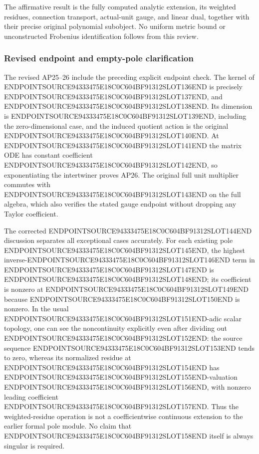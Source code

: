 The affirmative result is the fully computed analytic extension, its weighted residues, connection transport, actual-unit gauge, and linear dual, together with their precise original polynomial subobject. No uniform metric bound or unconstructed Frobenius identification follows from this review.

\subsubsection{Revised endpoint and empty-pole clarification}\label{endpoint-analytic_pole_review--revised-endpoint-and-empty-pole-clarification}

The revised AP25--26 include the preceding explicit endpoint check. The kernel of ENDPOINTSOURCE94333475E18C0C604BF91312SLOT136END is precisely ENDPOINTSOURCE94333475E18C0C604BF91312SLOT137END, and ENDPOINTSOURCE94333475E18C0C604BF91312SLOT138END. Its dimension is ENDPOINTSOURCE94333475E18C0C604BF91312SLOT139END, including the zero-dimensional case, and the induced quotient action is the original ENDPOINTSOURCE94333475E18C0C604BF91312SLOT140END. At ENDPOINTSOURCE94333475E18C0C604BF91312SLOT141END the matrix ODE has constant coefficient ENDPOINTSOURCE94333475E18C0C604BF91312SLOT142END, so exponentiating the intertwiner proves AP26. The original full unit multiplier commutes with ENDPOINTSOURCE94333475E18C0C604BF91312SLOT143END on the full algebra, which also verifies the stated gauge endpoint without dropping any Taylor coefficient.

The corrected ENDPOINTSOURCE94333475E18C0C604BF91312SLOT144END discussion separates all exceptional cases accurately. For each existing pole ENDPOINTSOURCE94333475E18C0C604BF91312SLOT145END, the highest inverse-ENDPOINTSOURCE94333475E18C0C604BF91312SLOT146END term in ENDPOINTSOURCE94333475E18C0C604BF91312SLOT147END is ENDPOINTSOURCE94333475E18C0C604BF91312SLOT148END; its coefficient is nonzero at ENDPOINTSOURCE94333475E18C0C604BF91312SLOT149END because ENDPOINTSOURCE94333475E18C0C604BF91312SLOT150END is nonzero. In the usual ENDPOINTSOURCE94333475E18C0C604BF91312SLOT151END-adic scalar topology, one can see the noncontinuity explicitly even after dividing out ENDPOINTSOURCE94333475E18C0C604BF91312SLOT152END: the source sequence ENDPOINTSOURCE94333475E18C0C604BF91312SLOT153END tends to zero, whereas its normalized residue at ENDPOINTSOURCE94333475E18C0C604BF91312SLOT154END has ENDPOINTSOURCE94333475E18C0C604BF91312SLOT155END-valuation ENDPOINTSOURCE94333475E18C0C604BF91312SLOT156END, with nonzero leading coefficient ENDPOINTSOURCE94333475E18C0C604BF91312SLOT157END. Thus the weighted-residue operation is not a coefficientwise continuous extension to the earlier formal pole module. No claim that ENDPOINTSOURCE94333475E18C0C604BF91312SLOT158END itself is always singular is required.

